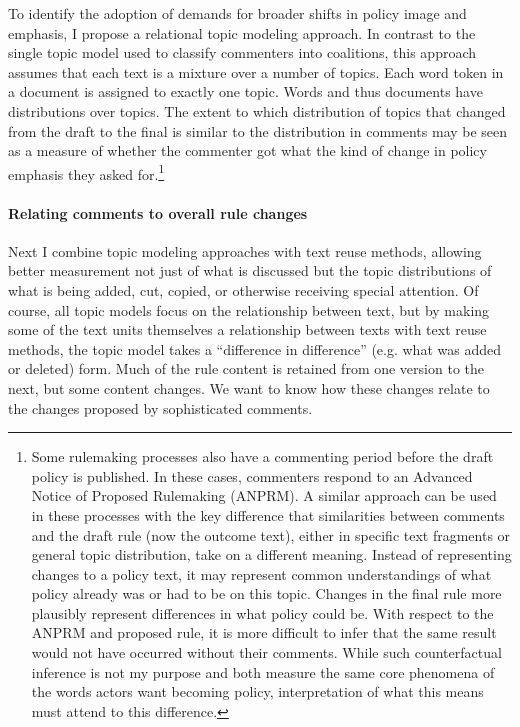 To identify the adoption of demands for broader shifts in policy image and emphasis, I propose a relational topic modeling approach. In contrast to the single topic model used to classify commenters into coalitions, this approach assumes that each text is a mixture over a number of topics. Each word token in a document is assigned to exactly one topic. Words and thus documents have distributions over topics. The extent to which distribution of topics that changed from the draft to the final is similar to the distribution in comments may be seen as a measure of whether the commenter got what the kind of change in policy emphasis they asked for.\footnote{
Some rulemaking processes also have a commenting period before the draft policy is published. In these cases, commenters respond to an Advanced Notice of Proposed Rulemaking (ANPRM). A similar approach can be used in these processes with the key difference that similarities between comments and the draft rule (now the outcome text), either in specific text fragments or general topic distribution, take on a different meaning. Instead of representing changes to a policy text, it may represent common understandings of what policy already was or had to be on this topic. Changes in the final rule more plausibly represent differences in what policy could be. With respect to the ANPRM and proposed rule, it is more difficult to infer that the same result would not have occurred without their comments. While such counterfactual inference is not my purpose and both measure the same core phenomena of the words actors want becoming policy, interpretation of what this means must attend to this difference.}

\paragraph{Relating comments to overall rule changes}

Next I combine topic modeling approaches with text reuse methods, allowing better measurement not just of what is discussed but the topic distributions of what is being added, cut, copied, or otherwise receiving special attention. 
Of course, all topic models focus on the relationship between text, but by making some of the text units themselves a relationship between texts with text reuse methods, the topic model takes a ``difference in difference'' (e.g. what was added or deleted) %
form. Much of the rule content is retained from one version to the next, but some content changes. We want to know how these changes relate to the changes proposed by sophisticated comments. 

